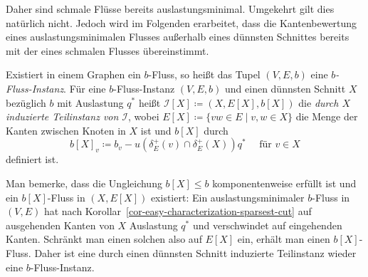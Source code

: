 Daher sind schmale Flüsse bereits auslastungsminimal.
Umgekehrt gilt dies natürlich nicht.
Jedoch wird im Folgenden erarbeitet, dass die Kantenbewertung eines auslastungsminimalen Flusses außerhalb eines dünnsten Schnittes bereits mit der eines schmalen Flusses übereinstimmt.

\begin{definition}
	Existiert in einem Graphen ein $b$-Fluss, so heißt das Tupel $(V, E, b)$ eine \emph{$b$-Fluss-Instanz}.
	Für eine $b$-Fluss-Instanz $(V, E, b)$ und einen dünnsten Schnitt $X$ bezüglich $b$ mit Auslastung $q^*$ heißt $\mathcal{I}[X] \coloneq (X, E[X], b[X])$ die \emph{durch $X$ induzierte Teilinstanz von $\mathcal{I}$},
	wobei $E[X] \coloneq \{ vw \in E \mid v, w \in X \}$ die Menge der Kanten zwischen Knoten in $X$ ist und $b[X]$ durch \[
	b[X]_v \coloneq b_v - u(\delta^+_E(v)\cap\delta^+_E(X)) q^* \text{~~~ für $v\in X$}
\] definiert ist.
\end{definition}

Man bemerke, dass die Ungleichung $b[X] \leq b$ komponentenweise erfüllt ist und ein $b[X]$-Fluss in $(X, E[X])$ existiert:
Ein auslastungsminimaler $b$-Fluss in $(V, E)$ hat nach Korollar~\ref{cor-easy-characterization-sparsest-cut} auf ausgehenden Kanten von $X$ Auslastung $q^*$ und verschwindet auf eingehenden Kanten.
Schränkt man einen solchen also auf $E[X]$ ein, erhält man einen $b[X]$-Fluss.
Daher ist eine durch einen dünnsten Schnitt induzierte Teilinstanz wieder eine  $b$-Fluss-Instanz.

